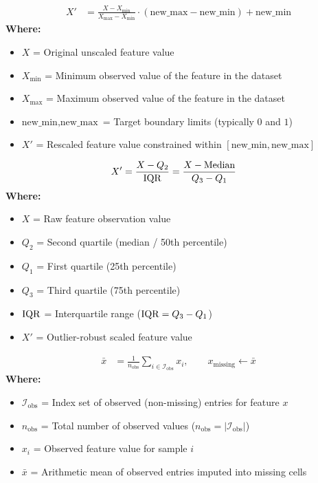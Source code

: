 \begin{formulabox}
\begin{align*}
    X' &= \frac{X - X_{\min}}{X_{\max} - X_{\min}} \cdot (\text{new\_max} - \text{new\_min}) + \text{new\_min}
\end{align*}
\textbf{Where:}
\begin{itemize}[noitemsep, topsep=1pt]
    \item $X$ = Original unscaled feature value
    \item $X_{\min}$ = Minimum observed value of the feature in the dataset
    \item $X_{\max}$ = Maximum observed value of the feature in the dataset
    \item $\text{new\_min}, \text{new\_max}$ = Target boundary limits (typically $0$ and $1$)
    \item $X'$ = Rescaled feature value constrained within $[\text{new\_min}, \text{new\_max}]$
\end{itemize}
\end{formulabox}

\begin{formulabox}
\begin{align*}
    X' &= \frac{X - Q_2}{\operatorname{IQR}} = \frac{X - \text{Median}}{Q_3 - Q_1}
\end{align*}
\textbf{Where:}
\begin{itemize}[noitemsep, topsep=1pt]
    \item $X$ = Raw feature observation value
    \item $Q_2$ = Second quartile (median / 50th percentile)
    \item $Q_1$ = First quartile (25th percentile)
    \item $Q_3$ = Third quartile (75th percentile)
    \item $\operatorname{IQR}$ = Interquartile range ($\operatorname{IQR} = Q_3 - Q_1$)
    \item $X'$ = Outlier-robust scaled feature value
\end{itemize}
\end{formulabox}

\begin{formulabox}
\begin{align*}
    \bar{x} &= \frac{1}{n_{\text{obs}}} \sum_{i \in \mathcal{I}_{\text{obs}}} x_i, \qquad x_{\text{missing}} \leftarrow \bar{x}
\end{align*}
\textbf{Where:}
\begin{itemize}[noitemsep, topsep=1pt]
    \item $\mathcal{I}_{\text{obs}}$ = Index set of observed (non-missing) entries for feature $x$
    \item $n_{\text{obs}}$ = Total number of observed values ($n_{\text{obs}} = |\mathcal{I}_{\text{obs}}|$)
    \item $x_i$ = Observed feature value for sample $i$
    \item $\bar{x}$ = Arithmetic mean of observed entries imputed into missing cells
\end{itemize}
\end{formulabox}

